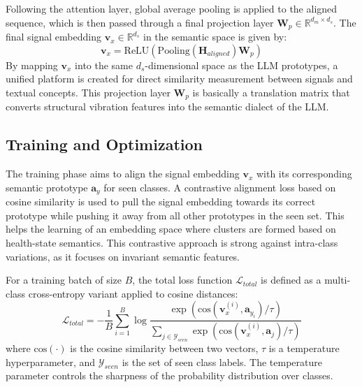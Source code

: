 \documentclass[journal]{IEEEtran}
\begin{document}
Following the attention layer, global average pooling is applied to the aligned sequence, which is then passed through a final projection layer $\mathbf{W}_p \in \mathbb{R}^{d_m \times d_s}$. The final signal embedding $\mathbf{v}_x \in \mathbb{R}^{d_s}$ in the semantic space is given by:
\begin{equation}
\mathbf{v}_x = \text{ReLU}(\text{Pooling}(\mathbf{H}_{aligned}) \mathbf{W}_p)
\end{equation}
By mapping $\mathbf{v}_x$ into the same $d_s$-dimensional space as the LLM prototypes, a unified platform is created for direct similarity measurement between signals and textual concepts. This projection layer $\mathbf{W}_p$ is basically a translation matrix that converts structural vibration features into the semantic dialect of the LLM.

\subsection{Training and Optimization}

The training phase aims to align the signal embedding $\mathbf{v}_x$ with its corresponding semantic prototype $\mathbf{a}_{y}$ for seen classes. A contrastive alignment loss \cite{chen2020simple} based on cosine similarity is used to pull the signal embedding towards its correct prototype while pushing it away from all other prototypes in the seen set. This helps the learning of an embedding space where clusters are formed based on health-state semantics. This contrastive approach is strong against intra-class variations, as it focuses on invariant semantic features.

For a training batch of size $B$, the total loss function $\mathcal{L}_{total}$ is defined as a multi-class cross-entropy variant applied to cosine distances:
\begin{equation}
\mathcal{L}_{total} = -\frac{1}{B} \sum_{i=1}^{B} \log \frac{\exp(\text{cos}(\mathbf{v}_x^{(i)}, \mathbf{a}_{y_i}) / \tau)}{\sum_{j \in \mathcal{Y}_{seen}} \exp(\text{cos}(\mathbf{v}_x^{(i)}, \mathbf{a}_j) / \tau)}
\end{equation}
where $\text{cos}(\cdot)$ is the cosine similarity between two vectors, $\tau$ is a temperature hyperparameter, and $\mathcal{Y}_{seen}$ is the set of seen class labels. The temperature parameter controls the sharpness of the probability distribution over classes.
\end{document}
